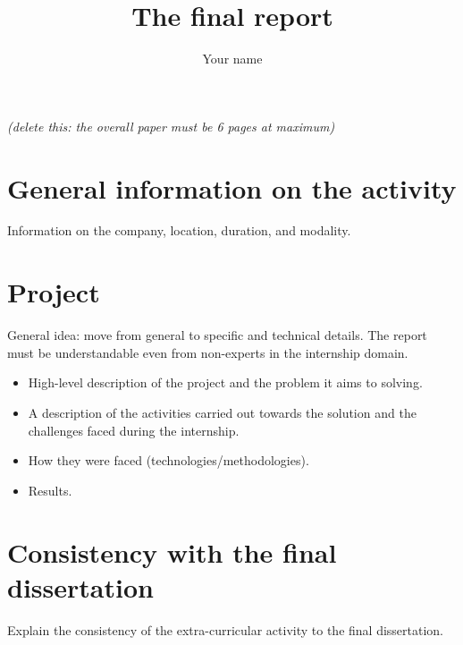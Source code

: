 \documentclass{article}
\title{The final report}
\author{Your name}
\begin{document}
\maketitle

\textit{(delete this: the overall paper must be 6 pages at maximum)}

\section{General information on the activity}

Information on the company, location, duration, and modality.

\section{Project}

General idea: move from general to specific and technical details.
The report must be understandable even from non-experts in the internship domain.

\begin{itemize}
    \item High-level description of the project and the problem it aims to solving.
    \item A description of the activities carried out towards the solution and the challenges faced during the internship.
    \item How they were faced (technologies/methodologies).
    \item Results.
\end{itemize}

\section{Consistency with the final dissertation}

Explain the consistency of the extra-curricular activity to the final dissertation. 
\end{document}
